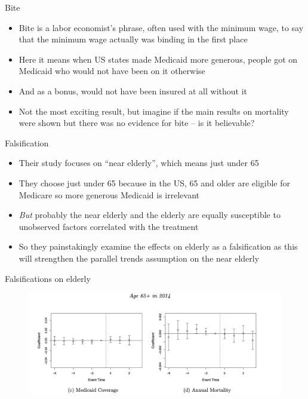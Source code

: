 \documentclass{beamer}
\begin{document}
\begin{frame}{Bite}

\begin{itemize}
\item Bite is a labor economist's phrase, often used with the minimum wage, to say that the minimum wage actually was binding in the first place
\item Here it means when US states made Medicaid more generous, people got on Medicaid who would not have been on it otherwise
\item And as a bonus, would not have been insured at all without it
\item Not the most exciting result, but imagine if the main results on mortality were shown but there was no evidence for bite -- is it believable?
\end{itemize}

\end{frame}






\begin{frame}{Falsification}

\begin{itemize}

\item Their study focuses on ``near elderly'', which means just under 65
\item They choose just under 65 because in the US, 65 and older are eligible for Medicare so more generous Medicaid is irrelevant
\item \emph{But} probably the near elderly and the elderly are equally susceptible to unobserved factors correlated with the treatment
\item So they painstakingly examine the effects on elderly as a falsification as this will strengthen the parallel trends assumption on the near elderly
\end{itemize}

\end{frame}

\begin{frame}{Falsifications on elderly}

	\begin{figure}
\includegraphics[scale=0.425]{./lecture_includes/placebo_medicaid}
	\end{figure}

\end{frame}
\end{document}
